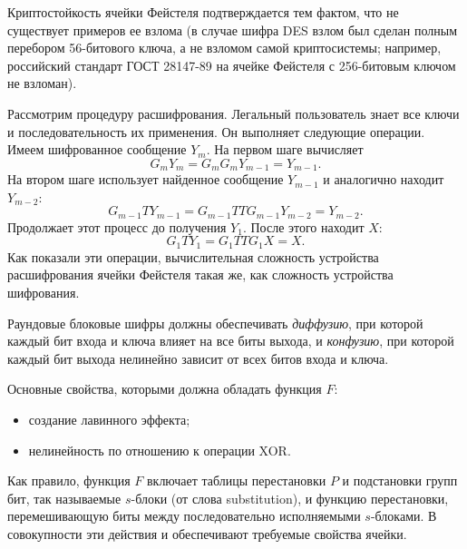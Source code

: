 Криптостойкость ячейки Фейстеля подтверждается тем фактом, что не существует примеров ее взлома (в случае шифра DES взлом был сделан полным перебором 56-битового ключа, а не взломом самой криптосистемы; например, российский стандарт ГОСТ 28147-89 на ячейке Фейстеля с 256-битовым ключом не взломан).

Рассмотрим процедуру расшифрования. Легальный пользователь знает все ключи и последовательность их применения. Он выполняет следующие операции. Имеем шифрованное сообщение $Y_{m}$. На первом шаге вычисляет
\[
    G_{m} Y_{m} = G_{m} G_{m} Y_{m-1} = Y_{m-1}.
\]
На втором шаге использует найденное сообщение $Y_{m-1}$ и аналогично находит $Y_{m-2}$:
\[
    G_{m-1} T Y_{m-1} = G_{m-1} T T G_{m-1} Y_{m-2} = Y_{m-2}.
\]
Продолжает этот процесс до получения $Y_{1}$. После этого находит $X$:
\[
    G_{1} T Y_{1} = G_{1} T T G_{1} X = X.
\]
Как показали эти операции, вычислительная сложность устройства расшифрования ячейки Фейстеля такая же, как сложность устройства шифрования.

Раундовые блоковые шифры должны обеспечивать \emph{диффузию}, при которой каждый бит входа и ключа влияет на все биты выхода, и \emph{конфузию}, при которой каждый бит выхода нелинейно зависит от всех битов входа и ключа.

Основные свойства, которыми должна обладать функция $F$:
\begin{itemize}
    \item создание лавинного эффекта;
    \item нелинейность по отношению к операции XOR.
\end{itemize}

Как правило, функция $F$ включает таблицы перестановки $P$ и подстановки групп бит, так называемые $s$-блоки (от слова substitution), и функцию перестановки, перемешивающую биты между последовательно исполняемыми $s$-блоками. В совокупности эти действия и обеспечивают требуемые свойства ячейки.
